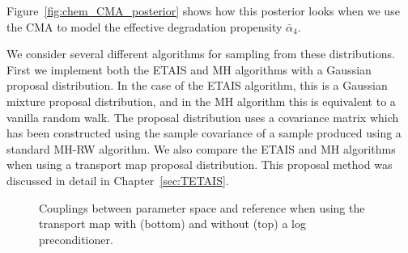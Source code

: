 \documentclass[final]{siamltex}
\newcommand\irregularcircle[2]{%
  \pgfextra {\pgfmathsetmacro\len{(#1)+rand*(#2)}}
  +(0:\len pt)
  \foreach \a in {10,20,...,350}{
    \pgfextra {\pgfmathsetmacro\len{(#1)+rand*(#2)}}
    -- +(\a:\len pt)
  } -- cycle
}
\begin{document}
Figure~\ref{fig:chem_CMA_posterior} shows how this posterior looks
when we use the CMA to model the effective degradation propensity $\bar{\alpha}_4$.

We consider several different algorithms for sampling from these
distributions. First we implement both the ETAIS and MH algorithms with
a Gaussian proposal distribution. In the case of the ETAIS algorithm,
this is a Gaussian mixture proposal distribution, and in the MH
algorithm this is equivalent to a vanilla random walk. The proposal distribution uses a covariance matrix which has been constructed using the sample covariance of a sample produced using a standard MH-RW algorithm. We also compare the ETAIS and MH algorithms when using a transport map proposal distribution. This proposal method was discussed in detail in Chapter~\ref{sec:TETAIS}.

\begin{figure}
	\centering

	\caption{Couplings between parameter space and reference
          when using the transport map with (bottom) and without (top)
        a log preconditioner.}
	\label{fig:chem_coupling}
\end{figure}
\end{document}
